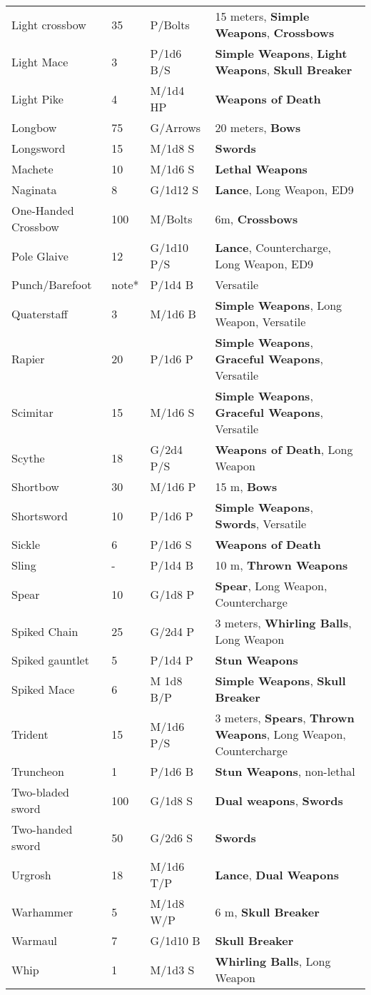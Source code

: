 \documentclass[a4paper,12 pt,openany]{book}
\begin{document}
\begin{textblock*}{19.5cm}
\begin{tabularx}{0.95\textwidth}{llll}
Light crossbow& 35 & P/Bolts& 15 meters, \textbf{Simple Weapons}, \textbf{Crossbows}\\
Light Mace& 3& P/1d6 B/S& \textbf{Simple Weapons}, \textbf{Light Weapons}, \textbf{Skull Breaker}\\
Light Pike& 4& M/1d4 HP&\textbf{Weapons of Death}\\
Longbow& 75 & G/Arrows& 20 meters, \textbf{Bows}\\
Longsword& 15 & M/1d8 S&\textbf{Swords}\\
Machete& 10 & M/1d6 S&\textbf{Lethal Weapons}\\
Naginata& 8& G/1d12 S&\textbf{Lance}, Long Weapon, ED9\\
One-Handed Crossbow& 100& M/Bolts& 6m, \textbf{Crossbows}\\
Pole Glaive& 12 & G/1d10 P/S& \textbf{Lance}, Countercharge, Long Weapon, ED9\\
Punch/Barefoot& note*& P/1d4 B&Versatile\\
Quaterstaff& 3& M/1d6 B& \textbf{Simple Weapons}, Long Weapon, Versatile\\
Rapier& 20 & P/1d6 P& \textbf{Simple Weapons}, \textbf{Graceful Weapons}, Versatile\\
Scimitar& 15 & M/1d6 S&\textbf{Simple Weapons}, \textbf{Graceful Weapons}, Versatile\\
Scythe& 18 & G/2d4 P/S& \textbf{Weapons of Death}, Long Weapon\\
Shortbow& 30 & M/1d6 P& 15 m, \textbf{Bows}\\
Shortsword& 10 & P/1d6 P&\textbf{Simple Weapons}, \textbf{Swords}, Versatile\\
Sickle& 6& P/1d6 S& \textbf{Weapons of Death}\\
Sling& -& P/1d4 B& 10 m, \textbf{Thrown Weapons}\\
Spear& 10 & G/1d8 P&\textbf{Spear}, Long Weapon, Countercharge\\
Spiked Chain& 25 & G/2d4 P& 3 meters, \textbf{Whirling Balls}, Long Weapon\\
Spiked gauntlet& 5& P/1d4 P&\textbf{Stun Weapons}\\
Spiked Mace& 6& M 1d8 B/P& \textbf{Simple Weapons}, \textbf{Skull Breaker}\\
Trident& 15 & M/1d6 P/S& 3 meters, \textbf{Spears}, \textbf{Thrown Weapons}, Long Weapon, Countercharge\\
Truncheon& 1& P/1d6 B& \textbf{Stun Weapons}, non-lethal\\
Two-bladed sword& 100& G/1d8 S& \textbf{Dual weapons}, \textbf{Swords}\\
Two-handed sword& 50 & G/2d6 S&\textbf{Swords}\\
Urgrosh& 18 & M/1d6 T/P& \textbf{Lance}, \textbf{Dual Weapons}\\
Warhammer& 5& M/1d8 W/P& 6 m, \textbf{Skull Breaker}\\
Warmaul& 7& G/1d10 B& \textbf{Skull Breaker}\\
Whip& 1& M/1d3 S& \textbf{Whirling Balls}, Long Weapon\\
\end{tabularx}

\end{textblock*}
\end{document}
